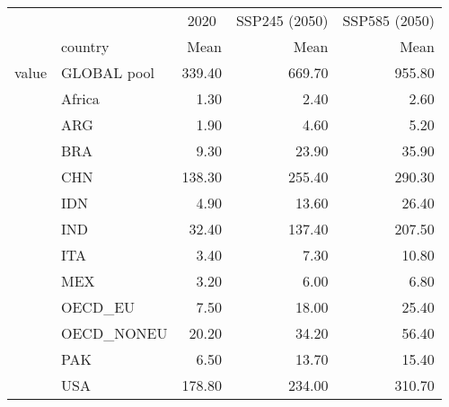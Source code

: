 \begin{table}
\centering
\begin{tabular}[t]{llrrr}
\toprule
\multicolumn{2}{c}{ } & \multicolumn{1}{c}{2020} & \multicolumn{1}{c}{SSP245 (2050)} & \multicolumn{1}{c}{SSP585 (2050)} \\
\cmidrule(l{3pt}r{3pt}){3-3} \cmidrule(l{3pt}r{3pt}){4-4} \cmidrule(l{3pt}r{3pt}){5-5}
  & country & Mean & Mean & Mean\\
\midrule
value & GLOBAL pool & \num{339.40} & \num{669.70} & \num{955.80}\\
 & Africa & \num{1.30} & \num{2.40} & \num{2.60}\\
 & ARG & \num{1.90} & \num{4.60} & \num{5.20}\\
 & BRA & \num{9.30} & \num{23.90} & \num{35.90}\\
 & CHN & \num{138.30} & \num{255.40} & \num{290.30}\\
 & IDN & \num{4.90} & \num{13.60} & \num{26.40}\\
 & IND & \num{32.40} & \num{137.40} & \num{207.50}\\
 & ITA & \num{3.40} & \num{7.30} & \num{10.80}\\
 & MEX & \num{3.20} & \num{6.00} & \num{6.80}\\
 & OECD\_EU & \num{7.50} & \num{18.00} & \num{25.40}\\
 & OECD\_NONEU & \num{20.20} & \num{34.20} & \num{56.40}\\
 & PAK & \num{6.50} & \num{13.70} & \num{15.40}\\
 & USA & \num{178.80} & \num{234.00} & \num{310.70}\\
\bottomrule
\end{tabular}
\end{table}
